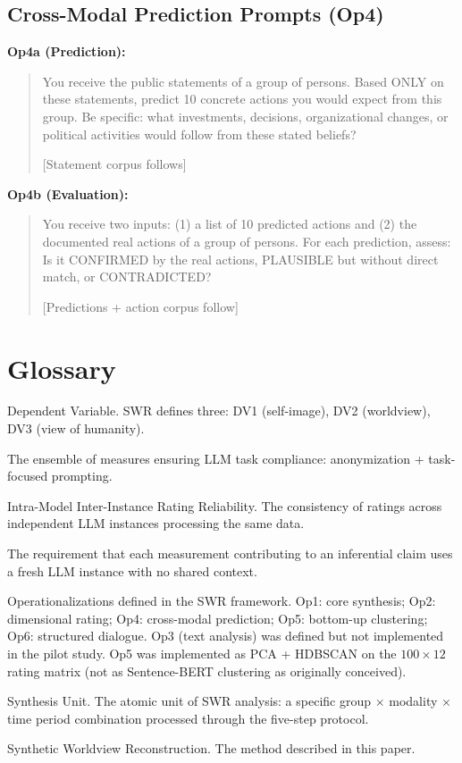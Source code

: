 \documentclass[11pt,a4paper]{article}
\newenvironment{promptquote}{%
  \begin{quote}\footnotesize\ttfamily\raggedright\sloppy
}{%
  \end{quote}
}
\begin{document}
\subsection{Cross-Modal Prediction Prompts (Op4)}

\textbf{Op4a (Prediction):}
\begin{promptquote}
You receive the public statements of a group of persons. Based ONLY on these statements, predict 10 concrete actions you would expect from this group. Be specific: what investments, decisions, organizational changes, or political activities would follow from these stated beliefs?

[Statement corpus follows]
\end{promptquote}

\textbf{Op4b (Evaluation):}
\begin{promptquote}
You receive two inputs: (1) a list of 10 predicted actions and (2) the documented real actions of a group of persons. For each prediction, assess: Is it CONFIRMED by the real actions, PLAUSIBLE but without direct match, or CONTRADICTED?

[Predictions + action corpus follow]
\end{promptquote}


\section{Glossary}
\label{app:glossary}

\begin{description}[style=nextline, leftmargin=2cm]
  \item[DV] Dependent Variable. SWR defines three: DV1 (self-image), DV2 (worldview), DV3 (view of humanity).
  \item[Focus Control] The ensemble of measures ensuring LLM task compliance: anonymization + task-focused prompting.
  \item[IMIIRR] Intra-Model Inter-Instance Rating Reliability. The consistency of ratings across independent LLM instances processing the same data.
  \item[Instance Separation] The requirement that each measurement contributing to an inferential claim uses a fresh LLM instance with no shared context.
  \item[Op1--Op6] Operationalizations defined in the SWR framework. Op1: core synthesis; Op2: dimensional rating; Op4: cross-modal prediction; Op5: bottom-up clustering; Op6: structured dialogue. Op3 (text analysis) was defined but not implemented in the pilot study. Op5 was implemented as PCA + HDBSCAN on the $100 \times 12$ rating matrix (not as Sentence-BERT clustering as originally conceived).
  \item[SU] Synthesis Unit. The atomic unit of SWR analysis: a specific group $\times$ modality $\times$ time period combination processed through the five-step protocol.
  \item[SWR] Synthetic Worldview Reconstruction. The method described in this paper.
\end{description}
\end{document}
